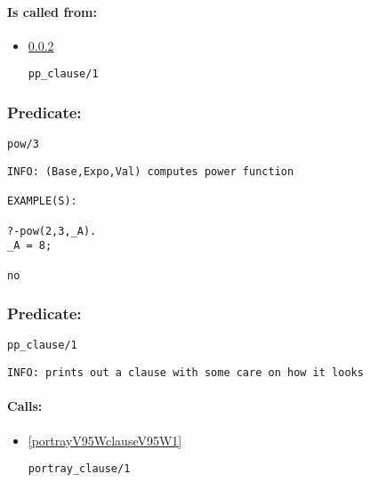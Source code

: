 \paragraph{Is called from:} 
\begin{itemize}
\item \ref{ppV95WclauseV95W1} 
\begin{verbatim}
pp_clause/1
\end{verbatim}

\end{itemize}

\subsubsection{Predicate:} \label{powV95W3}

\begin{verbatim}
pow/3
\end{verbatim}

{\small \begin{verbatim}
INFO: (Base,Expo,Val) computes power function

EXAMPLE(S):

?-pow(2,3,_A).
_A = 8;

no

\end{verbatim}}

\subsubsection{Predicate:} \label{ppV95WclauseV95W1}

\begin{verbatim}
pp_clause/1
\end{verbatim}

{\small \begin{verbatim}
INFO: prints out a clause with some care on how it looks

\end{verbatim}}
\paragraph{Calls:} 
\begin{itemize}
\item \ref{portrayV95WclauseV95W1} 
\begin{verbatim}
portray_clause/1
\end{verbatim}

\end{itemize}
